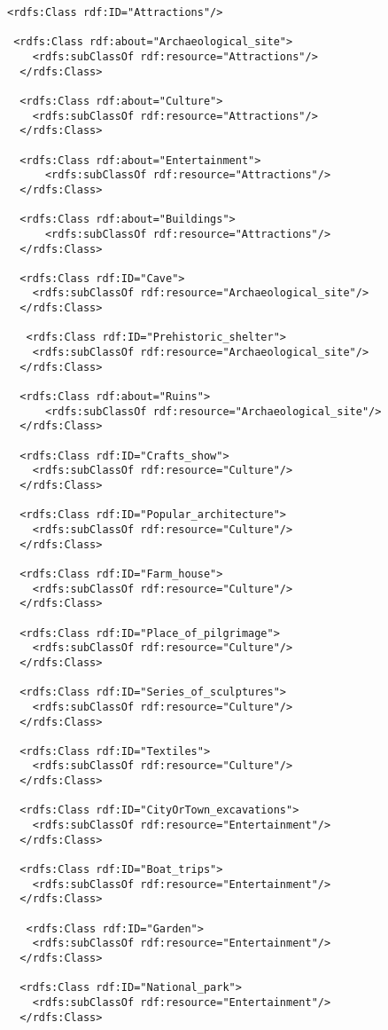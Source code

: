 \begin{verbatim}
<rdfs:Class rdf:ID="Attractions"/>
 
 <rdfs:Class rdf:about="Archaeological_site">
    <rdfs:subClassOf rdf:resource="Attractions"/>
  </rdfs:Class>

  <rdfs:Class rdf:about="Culture">
    <rdfs:subClassOf rdf:resource="Attractions"/>
  </rdfs:Class>
  
  <rdfs:Class rdf:about="Entertainment">
      <rdfs:subClassOf rdf:resource="Attractions"/>
  </rdfs:Class>

  <rdfs:Class rdf:about="Buildings">
      <rdfs:subClassOf rdf:resource="Attractions"/>
  </rdfs:Class>
   
  <rdfs:Class rdf:ID="Cave">
    <rdfs:subClassOf rdf:resource="Archaeological_site"/>
  </rdfs:Class>
   
   <rdfs:Class rdf:ID="Prehistoric_shelter">
    <rdfs:subClassOf rdf:resource="Archaeological_site"/>
  </rdfs:Class>
        
  <rdfs:Class rdf:about="Ruins">
      <rdfs:subClassOf rdf:resource="Archaeological_site"/>
  </rdfs:Class> 
  
  <rdfs:Class rdf:ID="Crafts_show">
    <rdfs:subClassOf rdf:resource="Culture"/>
  </rdfs:Class>
       
  <rdfs:Class rdf:ID="Popular_architecture">
    <rdfs:subClassOf rdf:resource="Culture"/>
  </rdfs:Class>
  
  <rdfs:Class rdf:ID="Farm_house">
    <rdfs:subClassOf rdf:resource="Culture"/>
  </rdfs:Class>
     
  <rdfs:Class rdf:ID="Place_of_pilgrimage">
    <rdfs:subClassOf rdf:resource="Culture"/>
  </rdfs:Class>
     
  <rdfs:Class rdf:ID="Series_of_sculptures">
    <rdfs:subClassOf rdf:resource="Culture"/>
  </rdfs:Class>
  
  <rdfs:Class rdf:ID="Textiles">
    <rdfs:subClassOf rdf:resource="Culture"/>
  </rdfs:Class>
  
  <rdfs:Class rdf:ID="CityOrTown_excavations">
    <rdfs:subClassOf rdf:resource="Entertainment"/>
  </rdfs:Class>
  
  <rdfs:Class rdf:ID="Boat_trips">
    <rdfs:subClassOf rdf:resource="Entertainment"/>
  </rdfs:Class>
  
   <rdfs:Class rdf:ID="Garden">
    <rdfs:subClassOf rdf:resource="Entertainment"/>
  </rdfs:Class>
  
  <rdfs:Class rdf:ID="National_park">
    <rdfs:subClassOf rdf:resource="Entertainment"/>
  </rdfs:Class>
  

\end{verbatim}
